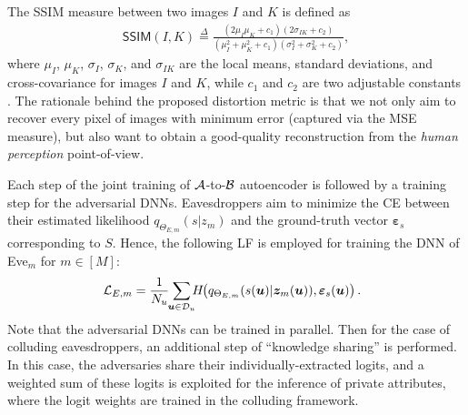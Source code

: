 \documentclass[conference]{IEEEtran}
\begin{document}
{    The SSIM measure between two images $I$ and  $K$ is defined as 
    \begin{align}\label{eq: ssim}
    	\mathsf{SSIM}(I, K) \overset{\Delta}{=} \frac{(2\mu_{I}\mu_{K}+c_1)
    		(2\sigma_{IK}+c_2)}{(\mu^2_{I}+\mu^2_{K}+c_1)(\sigma^2_{I}+\sigma^2_{K}+c_2)}, 
    \end{align} 
    where   $\mu_{I}$, $\mu_{K}$, $\sigma_{I}$, $\sigma_{K}$, and $\sigma_{IK}$ are the local means, standard deviations, and cross-covariance for images $I$ and  $K$, while $c_1$ and $c_2$ are two adjustable constants \cite{ssim-learning}.  
    The rationale behind 
    the  proposed distortion metric 
    is that we not only aim to recover every pixel of images with minimum error (captured via the MSE measure), but also want to obtain a 
    good-quality  reconstruction from the  \emph{human perception} point-of-view. 
    
    

		Each step of the  joint training of $\cal A$-to-$\cal B$ autoencoder  is  followed by a training step  for the adversarial DNNs.
		Eavesdroppers aim to minimize the CE between their estimated likelihood $q_{\Theta_{E,m}}({s|z_m})$ and the ground-truth vector ${{\bm \varepsilon}_s}$ corresponding to $S$. 
		Hence, the following  LF is employed  for   training  the DNN of  Eve$_{m}$ for $ m \in [M]$:     
		\begin{align}\label{eq:L_E}
			\hspace{-2mm}{\cal L}_{E,m} =  \frac{1}{N_{u}} 
				\hspace{-1mm}
			\sum_{{\bm u} \in \mathcal{D}_u}
				\hspace{-1.5mm}
			H\hspace{-1mm}\left(q_{\Theta_{E,m}}({s{(\bm u)}|{\bm z}_m{(\bm u)}}),{{\bm \varepsilon}_{s}}{(\bm u)}\right). 
		\end{align}  
	Note that the adversarial DNNs can be trained in parallel.  
	Then for the case of colluding eavesdroppers, an additional step of ``knowledge sharing'' is performed. In this case,  the adversaries share their individually-extracted logits, and a weighted sum of these logits is exploited for the inference of private attributes, where the logit  weights are  trained  in the colluding framework.   
	
}
\end{document}
